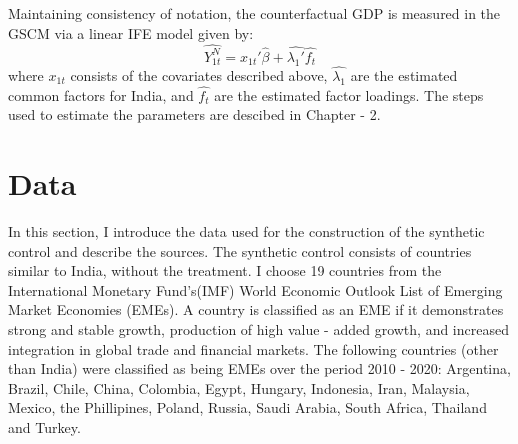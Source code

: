 \documentclass[12pt,nobind, a4paper]{reedthesis}
\begin{document}
 Maintaining consistency of notation, the counterfactual GDP is measured in the GSCM via a linear IFE model given by:
 \begin{equation}
 \hat{Y_{1t}^{N}}=x_{1t}'\hat{\beta}+\hat{\lambda_{1}'}\hat{f_{t}}
 \label{eq:eq009}
 \end{equation}
 where \(x_{1t}\) consists of the covariates described above, \(\hat{\lambda_{1}}\) are the estimated common factors for India, and \(\hat{f_{t}}\) are the estimated factor loadings. The steps used to estimate the parameters are descibed in Chapter - 2.

 \hypertarget{data}{%
 \section{Data}\label{data}}

 In this section, I introduce the data used for the construction of the synthetic control and describe the sources. The synthetic control consists of countries similar to India, without the treatment. I choose 19 countries from the International Monetary Fund's(IMF) World Economic Outlook List of Emerging Market Economies (EMEs). A country is classified as an EME if it demonstrates strong and stable growth, production of high value - added growth, and increased integration in global trade and financial markets. The following countries (other than India) were classified as being EMEs over the period 2010 - 2020: Argentina, Brazil, Chile, China, Colombia, Egypt, Hungary, Indonesia, Iran, Malaysia, Mexico, the Phillipines, Poland, Russia, Saudi Arabia, South Africa, Thailand and Turkey.
 \linebreak
\end{document}
